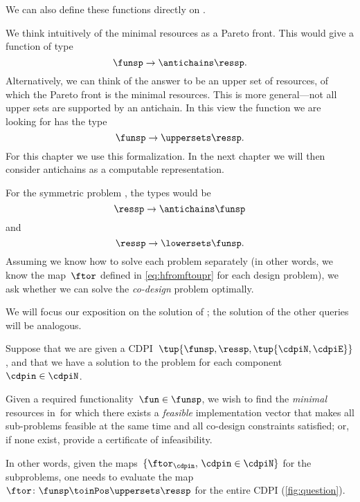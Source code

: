 We can also define these functions directly on \DP.

We think intuitively of the minimal resources as a Pareto front.
This would give a function of type
\begin{equation}
	\funsp \to \antichains\ressp.
\end{equation}
Alternatively, we can think of the answer to be an upper set of resources, of which the Pareto front is the minimal resources.
This is more general---not all upper sets are supported by an antichain.
In this view the function we are looking for has the type
\begin{equation}
	\funsp \to \uppersets\ressp.
\end{equation}
For this chapter we use this formalization.
In the next chapter we will then consider antichains as a computable representation.

For the symmetric problem \FixResMaxFun, the types would be
\begin{equation}
	\ressp \to \antichains\funsp
\end{equation}
and
\begin{equation}
	\ressp \to \lowersets\funsp.
\end{equation}
%
Assuming we know how to solve each problem separately (in other words, we know the map~$\ftor$ defined in \cref{eq:hfromftoupr} for each design problem), we ask whether we can solve the \emph{co-design} problem optimally.

We will focus our exposition on the solution of \FixFunMinRes; the solution of the other queries will be analogous.

\begin{problem}
\label{prob:MCDP}
Suppose that we are given a CDPI~$\tup{ \funsp,\ressp,\tup{ \cdpiN,\cdpiE} }$, and that we have a solution to the \FixFunMinRes problem for each component~$\cdpin\in\cdpiN$.

Given a required functionality~$\fun\in\funsp$, we wish to find the \emph{minimal} resources in~\ressp for which there exists a \emph{feasible} implementation vector that makes all sub-problems feasible at the same time and all co-design constraints satisfied; or, if none exist, provide a certificate of infeasibility.
\end{problem}
In other words, given the maps~$\{\ftor_{\cdpin},\,\cdpin\in\cdpiN\}$ for the subproblems, one needs to evaluate  the map~$\ftor\colon\funsp \toinPos \uppersets \ressp$ for the entire CDPI (\cref{fig:question}).

